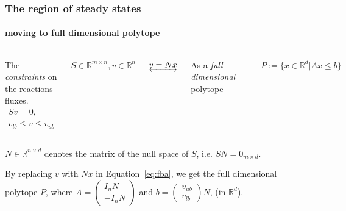 \documentclass{beamer}
\begin{document}
   \begin{frame}
      \frametitle{The region of steady states}
      \framesubtitle{moving to full dimensional polytope}

      \begin{columns}[onlytextwidth]

         \centering

            \small
            The \textit{constraints} on the reactions fluxes.
             \begin{equation}
               \begin{split}
                Sv=0, \\ 
                v_{lb} \leq v \leq v_{ub}
               \end{split}
            \label{eq:fba}
            \end{equation}
 

            \bigskip
            $S \in \mathbb{R}^{m \times n}, v \in \mathbb{R}^{n}$


         \centering
            $\underleftrightarrow{v = Nx}$

         \centering

            As a \textit{full dimensional} polytope

            \includegraphics[width=30mm]{../met_nets/resources/3dpoly.svg.png}

            $P := \{x \in \mathbb{R}^d | Ax \leq b\}$

      \end{columns}

      \bigskip

      \footnotesize
      $N\in\mathbb{R}^{n\times d}$ denotes the matrix of the null space of $S$,
      i.e. $S N = 0_{m \times d}$. \bigskip

      \footnotesize
      By replacing $v$ with $Nx$ in Equation~\ref{eq:fba}, we get the full dimensional polytope $P$,  
      where 
      $A = \begin{pmatrix} I_n N \\ -I_n N\end{pmatrix}$
      and 
      $b = \begin{pmatrix} v_{ub} \\ v_{lb} \end{pmatrix}  N$, (in $\mathbb{R}^d$).

   \end{frame}
\end{document}
